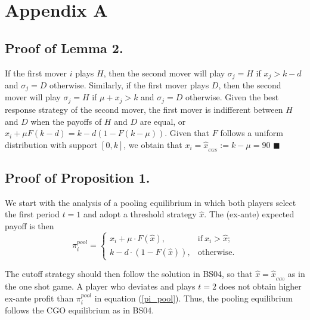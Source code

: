 \documentclass[12pt, letterpaper]{article}
\theoremstyle{plain}
\begin{document}
\newpage
\section*{Appendix A}

\subsection*{Proof of Lemma 2.}

If the first mover $i$ plays $H$, then the second mover will play $\sigma_j= H$ if $x_j> k-d$ and $\sigma_j= D$ otherwise. Similarly, if the first mover plays $D$, then the second mover will play $\sigma_j= H$ if $\mu+x_j> k$ and  $\sigma_j= D$ otherwise. Given the best response strategy of the second mover, the first mover is indifferent between $H$ and $D$ when the payoffs of $H$ and $D$ are equal, or $x_i + \mu F(k-d) = k - d(1-F(k-\mu))$. Given that $F$ follows a uniform distribution with support $[0,k]$, we obtain that $x_i=\hat{x}_{_{CGS}}:= k-\mu=90$ $\blacksquare$

\subsection*{Proof of Proposition 1.}

We start with the analysis of a pooling equilibrium in which both players select the first period $t=1$ and adopt a threshold strategy $\hat{x}$. The (ex-ante) expected payoff is then
\begin{equation}
   \pi^{pool}_{i} = 
   \begin{cases}
    x_i + \mu \cdot F(\hat{x}), &  \text{if} \  x_{i}> \hat{x};\\
    k - d \cdot (1-F(\hat{x})), & \text{otherwise}. 
   \end{cases}
   \label{pi_pool}
\end{equation}

The cutoff strategy should then follow the solution in BS04, so that $\hat{x}=\hat{x}_{_{CG0}}$ as in the one shot game. A player who deviates and plays $t=2$ does not obtain higher ex-ante profit than $\pi^{pool}_{i}$  in equation (\ref{pi_pool}). Thus, the pooling equilibrium follows the CGO equilibrium as in BS04. 
\end{document}

